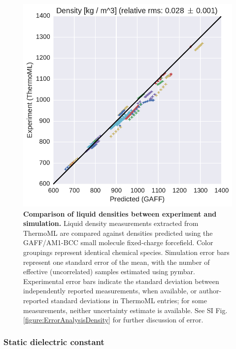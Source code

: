 \documentclass[aps,pre,twocolumn,nofootinbib,superscriptaddress,linenumbers]{revtex4-1}
\begin{document}
\begin{figure}
\includegraphics[width=\columnwidth]{./figures/densities_thermoml.pdf}
\caption{{\bf Comparison of liquid densities between experiment and simulation.}
Liquid density measurements extracted from ThermoML are compared against densities predicted using the GAFF/AM1-BCC small molecule fixed-charge forcefield.
Color groupings represent identical chemical species.  
Simulation error bars represent one standard error of the mean, with the number of effective (uncorrelated) samples estimated using pymbar.  
Experimental error bars indicate the standard deviation between independently reported measurements, when available, or author-reported standard deviations in ThermoML entries; for some measurements, neither uncertainty estimate is available.  
See SI Fig. \ref{figure:ErrorAnalysisDensity} for further discussion of error.
}
\label{figure:Density}
\end{figure}


\subsubsection{Static dielectric constant}
\end{document}
